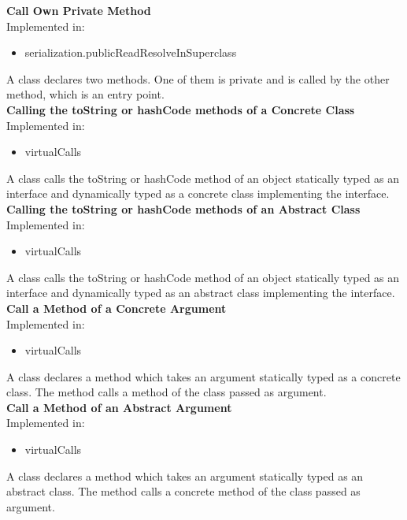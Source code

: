 \documentclass{article}
\begin{document}
\noindent
\textbf{Call Own Private Method}\\
Implemented in: 
\begin{itemize}
    \item serialization.publicReadResolveInSuperclass
\end{itemize}
A class declares two methods. One of them is private and is called by the other method, which is an entry point.\\

\noindent
\textbf{Calling the toString or hashCode methods of a Concrete Class}\\
Implemented in: 
\begin{itemize}
    \item virtualCalls
\end{itemize}
A class calls the toString or hashCode method of an object statically typed as an interface and dynamically typed as a concrete class implementing the interface.\\

\noindent
\textbf{Calling the toString or hashCode methods of an Abstract Class}\\
Implemented in: 
\begin{itemize}
    \item virtualCalls
\end{itemize}
A class calls the toString or hashCode method of an object statically typed as an interface and dynamically typed as an abstract class implementing the interface.\\

\noindent
\textbf{Call a Method of a Concrete Argument}\\
Implemented in: 
\begin{itemize}
    \item virtualCalls
\end{itemize}
A class declares a method which takes an argument statically typed as a concrete class. The method calls a method of the class passed as argument.\\

\noindent
\textbf{Call a Method of an Abstract Argument}\\
Implemented in: 
\begin{itemize}
    \item virtualCalls
\end{itemize}
A class declares a method which takes an argument statically typed as an abstract class. The method calls a concrete method of the class passed as argument.\\
\end{document}
